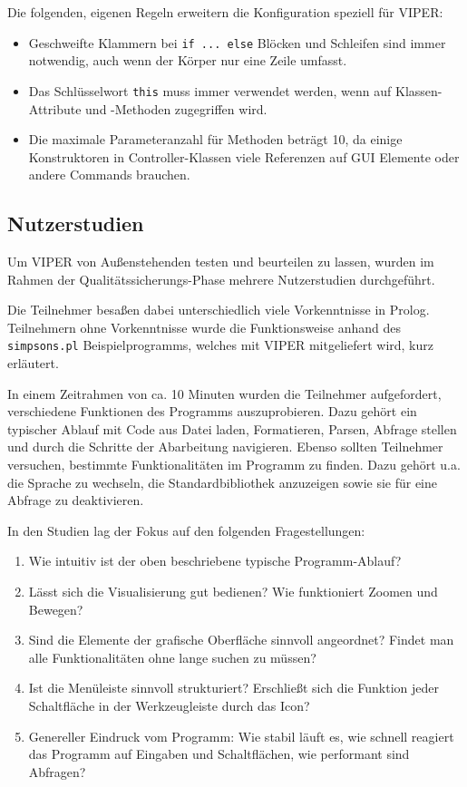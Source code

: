\documentclass[parskip=full,11pt,twoside]{scrartcl}
\begin{document}
Die folgenden, eigenen Regeln erweitern die Konfiguration speziell für VIPER:

\begin{itemize}
  \item Geschweifte Klammern bei \texttt{if ... else} Blöcken und Schleifen sind immer notwendig, auch wenn der Körper nur eine Zeile umfasst.
  \item Das Schlüsselwort \texttt{this} muss immer verwendet werden, wenn auf Klassen-Attribute und -Methoden zugegriffen wird.
  \item Die maximale Parameteranzahl für Methoden beträgt 10, da einige Konstruktoren in Controller-Klassen viele Referenzen auf GUI Elemente oder andere Commands brauchen.
\end{itemize}

\subsection{Nutzerstudien}

Um VIPER von Außenstehenden testen und beurteilen zu lassen, wurden im Rahmen der Qualitätssicherungs-Phase mehrere Nutzerstudien durchgeführt.

Die Teilnehmer besaßen dabei unterschiedlich viele Vorkenntnisse in Prolog. Teilnehmern ohne Vorkenntnisse wurde die Funktionsweise anhand des \texttt{simpsons.pl} Beispielprogramms, welches mit VIPER mitgeliefert wird, kurz erläutert.

In einem Zeitrahmen von ca. 10 Minuten wurden die Teilnehmer aufgefordert, verschiedene Funktionen des Programms auszuprobieren. Dazu gehört ein typischer Ablauf mit Code aus Datei laden, Formatieren, Parsen, Abfrage stellen und durch die Schritte der Abarbeitung navigieren. Ebenso sollten Teilnehmer versuchen, bestimmte Funktionalitäten im Programm zu finden. Dazu gehört u.a. die Sprache zu wechseln, die Standardbibliothek anzuzeigen sowie sie für eine Abfrage zu deaktivieren.

In den Studien lag der Fokus auf den folgenden Fragestellungen:

\begin{enumerate}
  \item Wie intuitiv ist der oben beschriebene typische Programm-Ablauf?
  \item Lässt sich die Visualisierung gut bedienen? Wie funktioniert Zoomen und Bewegen?
  \item Sind die Elemente der grafische Oberfläche sinnvoll angeordnet? Findet man alle Funktionalitäten ohne lange suchen zu müssen?
  \item Ist die Menüleiste sinnvoll strukturiert? Erschließt sich die Funktion jeder Schaltfläche in der Werkzeugleiste durch das Icon?
  \item Genereller Eindruck vom Programm: Wie stabil läuft es, wie schnell reagiert das Programm auf Eingaben und Schaltflächen, wie performant sind Abfragen?
\end{enumerate}
\end{document}

